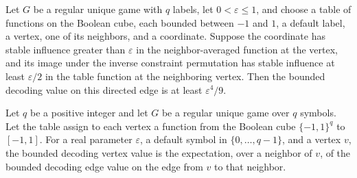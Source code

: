 \begin{theorem}
\label{FABL.RegularUniqueGame.epsilon_pow_four_div_nine_le_boundedDecodingEdgeValue}
\leanok
{}
Let $G$ be a regular unique game with $q$ labels, let $0<\varepsilon\le 1$, and choose a
table of functions on the Boolean cube, each bounded between $-1$ and $1$, a default
label, a vertex, one of its neighbors, and a coordinate. Suppose the coordinate has
stable influence greater than $\varepsilon$ in the neighbor-averaged function at the
vertex, and its image under the inverse constraint permutation has stable influence at
least $\varepsilon/2$ in the table function at the neighboring vertex. Then the bounded
decoding value on this directed edge is at least $\varepsilon^4/9$.
\end{theorem}

\begin{definition}
\label{FABL.RegularUniqueGame.boundedDecodingVertexValue}
\leanok
{}
Let $q$ be a positive integer and let $G$ be a regular unique game over $q$ symbols. Let
the table assign to each vertex a function from the Boolean cube $\{−1,1\}^{q}$ to
$[-1,1]$. For a real parameter $\varepsilon$, a default symbol in
$\{0,\ldots,q-1\}$, and a vertex $v$, the bounded decoding vertex value is the
expectation, over a neighbor of $v$, of the bounded decoding edge value on the edge from
$v$ to that neighbor.
\end{definition}

